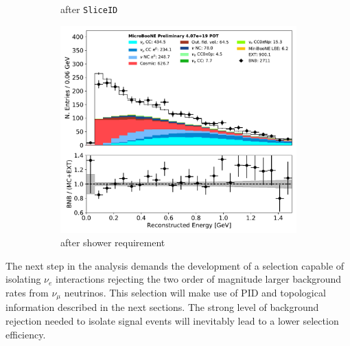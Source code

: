 \documentclass[a4paper]{article}
\begin{document}
\begin{figure}[ht]
\begin{center}
\begin{subfigure}[b]{0.31\textwidth}
    \caption{\label{fig:nuereco:sliceid} after \texttt{SliceID}}
    \end{subfigure}
    \begin{subfigure}[b]{0.31\textwidth}
    \centering
    \includegraphics[width=1.00\textwidth]{nureco/reco_e_01152020.pdf}
    \caption{\label{fig:nuereco:shower} after shower requirement}
    \end{subfigure}
\caption{\label{fig:nuereco}}
\end{center}
\end{figure}

\par The next step in the analysis demands the development of a selection capable of isolating $\nu_e$ interactions rejecting the two order of magnitude larger background rates from $\nu_{\mu}$ neutrinos. This selection will make use of PID and topological information described in the next sections. The strong level of background rejection needed to isolate signal events will inevitably lead to a lower selection efficiency.
\end{document}

